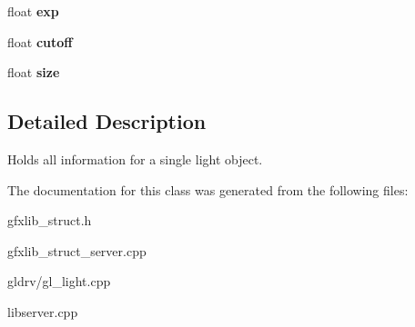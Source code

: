 \begin{DoxyCompactItemize}
\item 
float {\bfseries exp}\hypertarget{classGFXLight_ad9f3d780508b6b78918e42a9825ba677}{}\label{classGFXLight_ad9f3d780508b6b78918e42a9825ba677}

\item 
float {\bfseries cutoff}\hypertarget{classGFXLight_adc12f745ecff220e997c7158a5b42e91}{}\label{classGFXLight_adc12f745ecff220e997c7158a5b42e91}

\item 
float {\bfseries size}\hypertarget{classGFXLight_aaeaa2245ea4a6807bade07602589bbc9}{}\label{classGFXLight_aaeaa2245ea4a6807bade07602589bbc9}

\end{DoxyCompactItemize}


\subsection{Detailed Description}
Holds all information for a single light object. 

The documentation for this class was generated from the following files\+:\begin{DoxyCompactItemize}
\item 
gfxlib\+\_\+struct.\+h\item 
gfxlib\+\_\+struct\+\_\+server.\+cpp\item 
gldrv/gl\+\_\+light.\+cpp\item 
libserver.\+cpp\end{DoxyCompactItemize}
